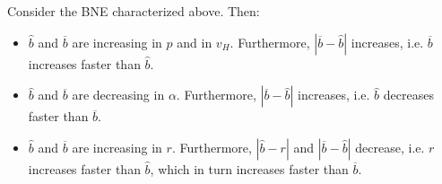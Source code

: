 \begin{cor}
Consider the BNE characterized above. Then:

\begin{itemize}
    \item[-] $ \hat{b} $ and $ \overline{b} $ are increasing in $ p $ and in $ v_H $.  Furthermore, $ |\overline{b} - \hat{b}| $ increases, i.e. $ \overline{b} $ increases faster than $ \hat{b} $.

    

    \item[-] $ \hat{b} $ and $ \overline{b} $ are decreasing in $ \alpha $.  Furthermore, $ |\overline{b} - \hat{b}| $ increases, i.e. $ \hat{b} $ decreases faster than $ \overline{b} $.

    

    \item[-] $ \hat{b} $ and $ \overline{b} $ are increasing in $ r $. Furthermore, $ |\hat{b} - r| $ and $ |\overline{b} - \hat{b}| $ decrease, i.e. $ r $ increases faster than $ \hat{b} $, which in turn increases faster than $ \overline{b} $.
\end{itemize}

\end{cor}


